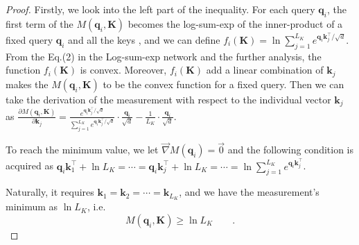 \documentclass[letterpaper]{article} %
\newcommand{\mb}{\mathbf}
\begin{document}
\begin{appendices}
\begin{proof}
Firstly, we look into the left part of the inequality. For each query $\mb{q}_i$,  the first term of the $M(\mb{q}_i, \mb{K})$ becomes the log-sum-exp of the inner-product of a fixed query $\mb{q}_i$ and all the keys , and we can define $f_i(\mb{K})=\ln \sum_{j=1}^{L_K} e^{{\mb{q}_i\mb{k}_j^{\top}}/{\sqrt{d}}}$. From the Eq.(2) in the Log-sum-exp network\cite{DBLP:journals/corr/abs-1806-07850} and the further analysis, the function $f_i(\mb{K})$ is convex. Moreover, $f_i(\mb{K})$ add a linear combination of $\mb{k}_j$ makes the $M(\mb{q}_i, \mb{K})$ to be the convex function for a fixed query. Then we can take the derivation of the measurement with respect to the individual vector $\mb{k}_j$ as $\frac{\partial M(\mb{q}_i, \mb{K})}{\partial \mb{k}_j} = \frac{e^{\mb{q}_i\mb{k}_j^{\top}/{\sqrt{d}}}}{\sum_{j=1}^{L_K} e^{\mb{q}_i\mb{k}_j^{\top}/{\sqrt{d}}}} \cdot \frac{\mb{q}_i}{\sqrt{d}} - \frac{1}{L_K} \cdot \frac{\mb{q}_i}{\sqrt{d}}$.

To reach the minimum value, we let $\vec{\nabla} M(\mb{q}_i) = \vec{0}$ and the following condition is acquired as $\mb{q}_i\mb{k}_1^{\top} + \ln L_K = \cdots = \mb{q}_i\mb{k}_j^{\top} + \ln L_K = \cdots = \ln \sum_{j=1}^{L_K} e^{\mb{q}_i\mb{k}_j^{\top}}$.

Naturally, it requires $\mb{k}_1=\mb{k}_2=\cdots=\mb{k}_{L_K}$, and we have the measurement's minimum as $\ln L_K$, i.e.
\begin{equation}
\label{eq.appendix.proof1.left}
    M(\mb{q}_i, \mb{K}) \geq \ln L_K \qquad.
\end{equation}


\end{proof}
\end{appendices}
\end{document}
